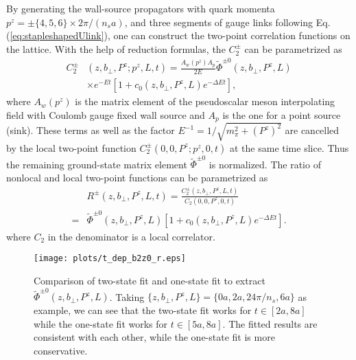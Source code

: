 \documentclass[prd,aps,twocolumn,preprintnumbers, showpacs, nofootinbib,superscriptaddress,notitlepage]{revtex4-1}
\begin{document}
By generating the wall-source propagators with quark momenta $p^z=\pm\{4,5,6\}\times2\pi/(n_sa)$, and three segments of gauge links following Eq.(\ref{eq:stapleshapedUlink}), one  can construct  the two-point correlation functions on the  lattice. With the help of reduction formulas, the $C_2^{\pm}$ can be parametrized as
 \begin{align}
C_2^{\pm}&\left(z,b_{\perp},P^z; p^z,L,t \right)=\frac{A_w(p^z)A_p}{2E}\tilde{\Phi}^{\pm0}\left(z,b_{\perp},P^z,L\right) \nonumber\\
& \times e^{-Et}\left[1+c_0\left(z,b_{\perp},P^z,L\right)e^{-\Delta Et} \right], \label{eq:C2parametrization}
 \end{align}
where $A_w(p^z)$ is the matrix element of the pseudoscalar meson interpolating ﬁeld with Coulomb gauge fixed wall source and $A_p$ is the one for a point source (sink). These terms as well as the factor $E^{-1}=1/\sqrt{m_{\pi}^2+\left(P^z\right)^2}$ are cancelled by the local  two-point function $C_2^{\pm}\left(0,0,P^z; p^z,0,t \right)$ at the same time slice. Thus the remaining  ground-state matrix element $\tilde{\Phi}^{\pm0}$ is normalized. The ratio of nonlocal and local two-point functions can be parametrized  as
\begin{align}
&R^{\pm}\left(z,b_{\perp},P^z,L,t \right)=\frac{C_2^{\pm}\left(z,b_{\perp},P^z,L,t \right)}{C_2\left(0,0,P^z,0,t \right)} \nonumber\\
=&\tilde{\Phi}^{\pm0}\left(z,b_{\perp},P^z,L\right)\left[1+c_0\left(z,b_{\perp},P^z,L\right)e^{-\Delta Et} \right].
\label{eq:two-state-fit}
\end{align}
where $C_2$ in the denominator is a local
correlator.
 
\begin{figure}
\centering
\texttt{[image: plots/t\_dep\_b2z0\_r.eps]}
\caption{Comparison of  two-state fit  and  one-state fit to extract $\tilde{\Phi}^{\pm0}\left(z,b_{\perp},P^z,L\right)$. Taking $\{z,b_{\perp},P^z,L\}=\{0a, 2a, 24\pi/n_s, 6a\}$ as example, we can see that  the two-state fit works for $t\in[2a, 8a]$ while the one-state fit works for $t\in[5a, 8a]$. The fitted  results are consistent with each other, while  the one-state fit is more conservative. }
\label{fig:tdependenceofratio}
\end{figure}
 
\end{document}
